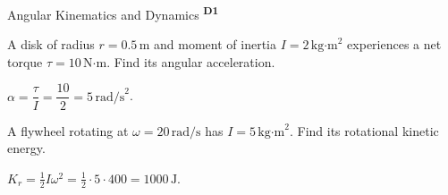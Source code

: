 ﻿\documentclass[12pt,a4paper]{article}
\providecommand{\KPProblems}{}
\newcommand{\DOne}{\texorpdfstring{\textsuperscript{\textbf{D1}}}{ D1}}
\begin{document}
\begin{KnowledgePoint}{Angular Kinematics and Dynamics \DOne}
  \KPProblems
\begin{cheatproblem}
  A disk of radius $r=0.5\,\text{m}$ and moment of inertia $I=2\,\text{kg·m}^2$ experiences a net torque $\tau=10\,\text{N·m}$. Find its angular acceleration.
\begin{solutionbox}
  $\alpha=\dfrac{\tau}{I}=\dfrac{10}{2}=5\,\text{rad/s}^2$.
\end{solutionbox}
\end{cheatproblem}
\begin{cheatproblem}
  A flywheel rotating at $\omega=20\,\text{rad/s}$ has $I=5\,\text{kg·m}^2$. Find its rotational kinetic energy.
\begin{solutionbox}
  $K_r=\tfrac12 I\omega^2=\tfrac12\cdot5\cdot400=1000\,\text{J}$.
\end{solutionbox}
\end{cheatproblem}
\end{KnowledgePoint}
\end{document}
